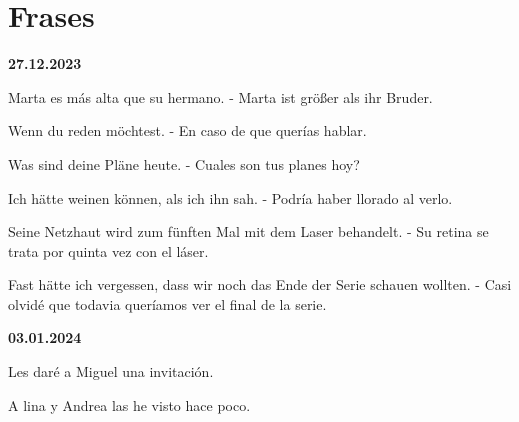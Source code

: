 \chapter{Frases}
\begin{frases}
    \item \textbf{27.12.2023}
    \item Marta es más alta que su hermano. - Marta ist größer
    als ihr Bruder.
    \item Wenn du reden möchtest. - En caso de que quer\'ias hablar.
    \item Was sind deine Pläne heute. - Cuales son tus planes hoy?
    \item Ich hätte weinen können, als ich ihn sah. - Podr\'ia haber llorado al 
    verlo.
    \item Seine Netzhaut wird zum fünften Mal mit dem Laser behandelt. - 
    Su retina se trata por quinta vez con el l\'aser.
    \item Fast hätte ich vergessen, dass wir noch das Ende der Serie schauen 
    wollten. - Casi olvid\'e que todavia quer\'iamos ver el final de la serie.
\end{frases}
\begin{frases}
    \item \textbf{03.01.2024}
    \item Les dar\'e a Miguel una invitaci\'on.
    \item A lina y Andrea las he visto hace poco.
\end{frases}
